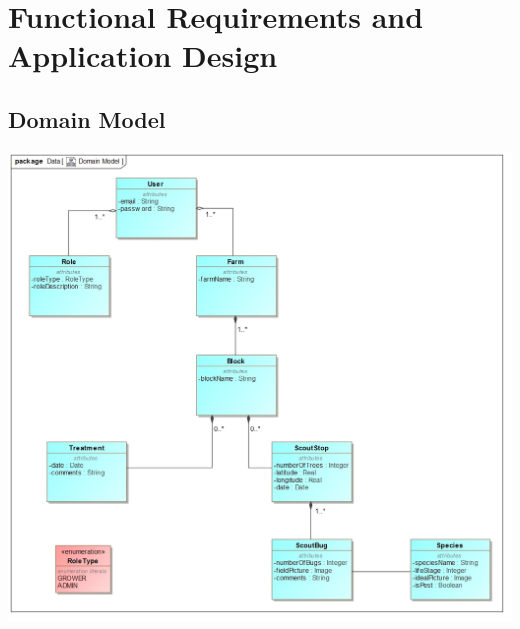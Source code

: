 \documentclass[11pt,a4paper,titlepage]{article}
\begin{document}
\section{Functional Requirements and Application Design}
	\subsection{Domain Model}
		\includegraphics[width=\linewidth]{DomainModel}
\end{document}

